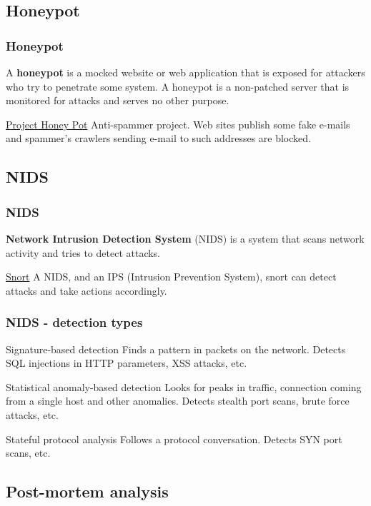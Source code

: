 \subsection{Honeypot}

\begin{frame}
\frametitle{Honeypot}
A \textbf{honeypot} is a mocked website or web application that is exposed for
attackers who try to penetrate some system. A honeypot is a non-patched server
that is monitored for attacks and serves no other purpose.
\begin{exampleblock}{\href{https://www.projecthoneypot.org/about_us.php}{Project Honey Pot}}
Anti-spammer project.
Web sites publish some fake e-mails and spammer's crawlers sending e-mail to
such addresses are blocked.
\end{exampleblock}
\end{frame}

\subsection{NIDS}

\begin{frame}
\frametitle{NIDS}
\textbf{Network Intrusion Detection System} (NIDS) is a system that scans
network activity and tries to detect attacks.
\begin{exampleblock}{\href{http://www.snort.org/}{Snort}}
A NIDS, and an IPS (Intrusion Prevention System), snort can detect attacks and
take actions accordingly.
\end{exampleblock}
\end{frame}

\begin{frame}
\frametitle{NIDS - detection types}
\begin{block}{Signature-based detection}
Finds a pattern in packets on the network.
Detects SQL injections in HTTP parameters, XSS attacks, etc.
\end{block}
\begin{block}{Statistical anomaly-based detection}
Looks for peaks in traffic, connection coming from a single host and other
anomalies.
Detects stealth port scans, brute force attacks, etc.
\end{block}
\begin{block}{Stateful protocol analysis}
Follows a protocol conversation.
Detects SYN port scans, etc.
\end{block}
\end{frame}

\subsection{Post-mortem analysis}

